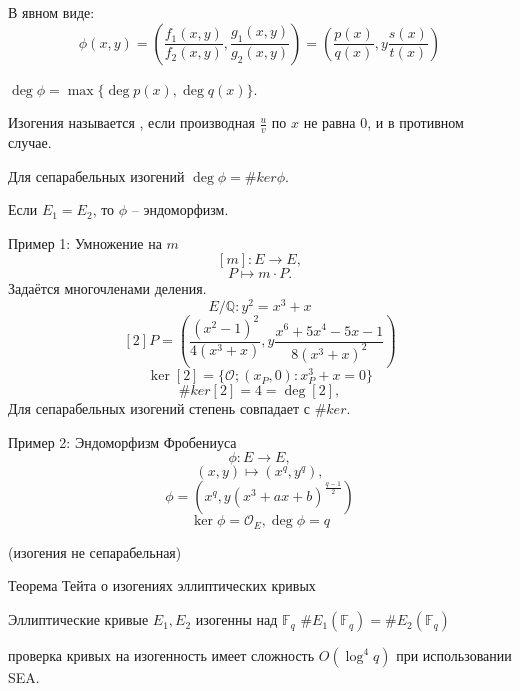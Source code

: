 \documentclass{beamer}
\begin{document}
\begin{frame}
    В явном виде:
	\[
	\phi(x, y) = \left( \frac{f_1(x,y)}{f_2(x,y)}, \frac{g_1(x,y)}{g_2(x,y)} \right)
	=
	\left(
	\frac{p(x)}{q(x)}, y \frac{s(x)}{t(x)}
	\right)
	\]
	
	\vspace*{1em}
	 $\deg\phi = \max\{\deg{p(x)}, \deg{q(x)}\}$.
	
	\vspace{1em}
	Изогения называется , если производная $\frac{u}{v}$ по $x$ не равна $0$, и  в противном случае.
	
	\vspace{1em}
	Для сепарабельных изогений $\deg\phi = \#ker\phi$.
	
	\vspace{1em}
	Если $E_1 = E_2$, то $\phi$ -- эндоморфизм.
	
\end{frame}

\begin{frame}{Пример 1: Умножение на $m$}
    \[[m]: E \rightarrow E,\]
    \[P \mapsto m \cdot P.\]
Задаётся многочленами деления.
\[E/\mathbb{Q}: y^2 = x^3 + x\]
\[
[2]P = \left( \frac{(x^2-1)^2}{4 (x^3 + x)}, y \frac{x^6 + 5 x^4 - 5 x - 1}{8 (x^3 + x)^2} \right)
\]
\[
\ker[2] = \{ \mathcal{O}; (x_P,0): x_P^3 + x = 0\}
\]
\[\#ker[2] = 4 = \deg[2],\]
Для сепарабельных изогений степень совпадает с $\#ker$.
\end{frame}

\begin{frame}{Пример 2: Эндоморфизм Фробениуса}
\[\phi: E \rightarrow E,\]
\[(x,y) \mapsto (x^q, y^q),\]
\[
\phi = (x^q, y (x^3 + a x + b)^{\frac{q-1}{2}})
\]
\[
\ker{\phi} = \mathcal{O}_E, \deg{\phi} = q
\]
\begin{center}
(изогения не сепарабельная)
\end{center}
\end{frame}

\begin{frame}{Теорема Тейта о изогениях эллиптических кривых}
	\begin{center}
		Эллиптические кривые $E_1, E_2$ изогенны над $\mathbb{F}_q$ \structure{$\iff$} $\#E_1(\mathbb{F}_q) = \#E_2(\mathbb{F}_q)$
	\end{center}
		 проверка кривых на изогенность имеет сложность $O(\log^4{q})$ при использовании SEA.
\end{frame}
\end{document}
